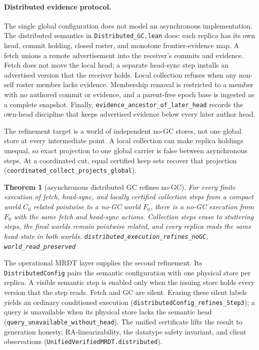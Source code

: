 \documentclass[11pt]{article}
\newtheorem{theorem}{Theorem}[section]
\newcommand{\lean}[1]{\texttt{#1}}
\newcommand{\code}[1]{\texttt{#1}}
\begin{document}
\paragraph{Distributed evidence protocol.} The single global configuration
does not model an asynchronous implementation. The distributed semantics in
\code{Distributed\_GC.lean} does: each replica has its own head, commit
holding, closed roster, and monotone frontier-evidence map. A fetch unions a
remote advertisement into the receiver's commits and evidence. Fetch does not
move the local head; a separate head-sync step installs an advertised version
that the receiver holds. Local collection refuses when any non-self roster
member lacks evidence. Membership removal is restricted to a member with no
authored commit or evidence, and a parent-free epoch base is ingested as a
complete snapshot. Finally,
\lean{evidence\_ancestor\_of\_later\_head} records the own-head discipline
that keeps advertised evidence below every later author head.

The refinement target is a world of independent no-GC stores, not one global
store at every intermediate point. A local collection can make replica
holdings unequal, so exact projection to one global carrier is false between
asynchronous steps. At a coordinated cut, equal certified keep sets recover
that projection (\lean{coordinated\_collect\_projects\_global}).

\begin{theorem}[asynchronous distributed GC refines no-GC]
\label{thm:distributedgc}
For every finite execution of fetch, head-sync, and locally certified
collection steps from a compact world $C_0$ related pointwise to a no-GC world
$F_0$, there is a no-GC execution from $F_0$ with the same fetch and head-sync
actions. Collection steps erase to stuttering steps, the final worlds remain
pointwise related, and every replica reads the same head state in both worlds.
\hfill\lean{distributed\_execution\_refines\_noGC},
\lean{world\_read\_preserved}
\end{theorem}

The operational MRDT layer supplies the second refinement. Its
\lean{DistributedConfig} pairs the semantic configuration with one physical
store per replica. A visible semantic step is enabled only when the issuing
store holds every version that the step reads. Fetch and GC are silent.
Erasing these silent labels yields an ordinary conditioned execution
(\lean{distributedConfig\_refines\_Step3}); a query is unavailable when its
physical store lacks the semantic head
(\lean{query\_unavailable\_without\_head}). The unified certificate lifts the
result to generation honesty, RA-linearizability, the datatype safety
invariant, and client observations
(\lean{UnifiedVerifiedMRDT.distributed}).
\end{document}
